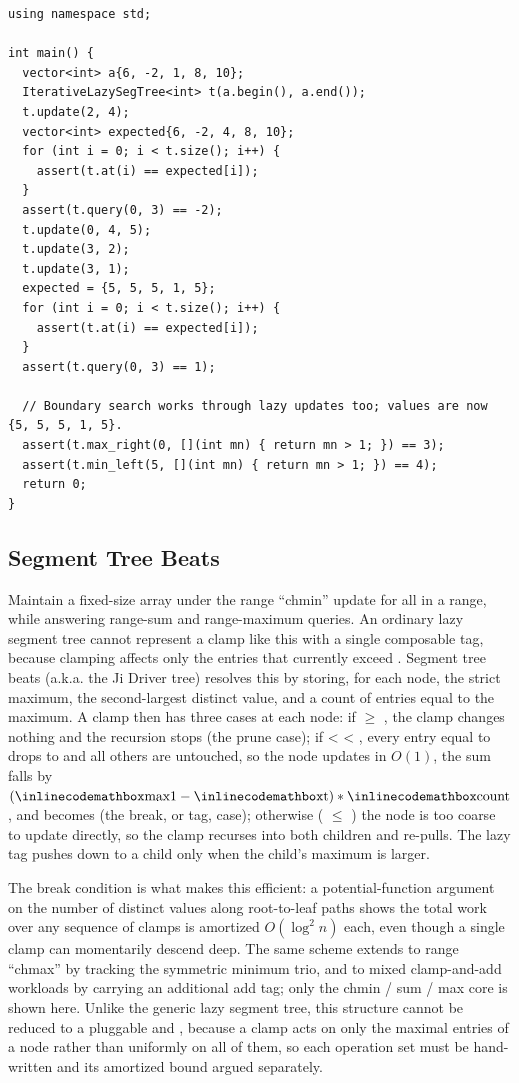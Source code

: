 \begin{lstlisting}[style=cpp]
using namespace std;

int main() {
  vector<int> a{6, -2, 1, 8, 10};
  IterativeLazySegTree<int> t(a.begin(), a.end());
  t.update(2, 4);
  vector<int> expected{6, -2, 4, 8, 10};
  for (int i = 0; i < t.size(); i++) {
    assert(t.at(i) == expected[i]);
  }
  assert(t.query(0, 3) == -2);
  t.update(0, 4, 5);
  t.update(3, 2);
  t.update(3, 1);
  expected = {5, 5, 5, 1, 5};
  for (int i = 0; i < t.size(); i++) {
    assert(t.at(i) == expected[i]);
  }
  assert(t.query(0, 3) == 1);

  // Boundary search works through lazy updates too; values are now {5, 5, 5, 1, 5}.
  assert(t.max_right(0, [](int mn) { return mn > 1; }) == 3);
  assert(t.min_left(5, [](int mn) { return mn > 1; }) == 4);
  return 0;
}
\end{lstlisting}
\subsection{Segment Tree Beats}
\label{sec:2.5.9}
Maintain a fixed-size array under the range ``chmin'' update  for all  in a range, while answering range-sum and range-maximum queries. An ordinary lazy segment tree cannot represent a clamp like this with a single composable tag, because clamping affects only the entries that currently exceed . Segment tree beats (a.k.a. the Ji Driver tree) resolves this by storing, for each node, the strict maximum, the second-largest distinct value, and a count of entries equal to the maximum. A clamp then has three cases at each node: if  $\geq$ , the clamp changes nothing and the recursion stops (the prune case); if  \textless{}  \textless{} , every entry equal to  drops to  and all others are untouched, so the node updates in $O(1)$, the sum falls by $({\inlinecodemath{max1}} - {\inlinecodemath{t}}) * {\inlinecodemath{count}}$, and  becomes  (the break, or tag, case); otherwise ( $\leq$ ) the node is too coarse to update directly, so the clamp recurses into both children and re-pulls. The lazy tag pushes down to a child only when the child's maximum is larger.

The break condition is what makes this efficient: a potential-function argument on the number of distinct values along root-to-leaf paths shows the total work over any sequence of clamps is amortized $O(\log^{2} n)$ each, even though a single clamp can momentarily descend deep. The same scheme extends to range ``chmax'' by tracking the symmetric minimum trio, and to mixed clamp-and-add workloads by carrying an additional add tag; only the chmin / sum / max core is shown here. Unlike the generic lazy segment tree, this structure cannot be reduced to a pluggable  and , because a clamp acts on only the maximal entries of a node rather than uniformly on all of them, so each operation set must be hand-written and its amortized bound argued separately.

